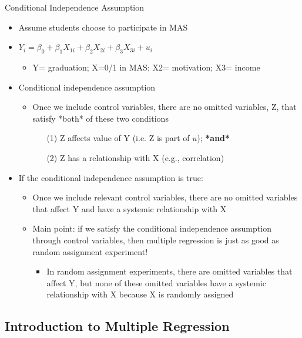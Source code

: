 \begin{frame}[shrink=10]{Conditional Independence Assumption}
	\begin{itemize}
	\item Assume students choose to participate in MAS
	\item $Y_{i} = \beta_{0} + \beta_{1}X_{1i} + \beta_{2}X_{2i} + \beta_{3}X_{3i} + u_{i}$
		\begin{itemize}
		\item Y= graduation; X=0/1 in MAS; X2= motivation; X3= income
		\end{itemize}
	\item Conditional independence assumption
		\begin{itemize}
		\item Once we include control variables, there are no omitted variables, Z, that satisfy *both* of these two conditions
			\begin{itemize}
			\item[(1)] Z affects value of Y (i.e. Z is part of $u$); \textbf{*and*}
			\item[(2)] Z has a relationship with X (e.g., correlation)
			\end{itemize}
		\end{itemize}
	\item If the conditional independence assumption is true:
		\begin{itemize}
		\item Once we include relevant control variables, there are no omitted variables that affect Y and have a systemic relationship with X
		\item Main point: if we satisfy the conditional independence assumption through control variables, then multiple regression is just as good as random assignment experiment!
			\begin{itemize}
			\item In random assignment experiments, there are omitted variables that affect Y, but none of these omitted variables have a systemic relationship with X because X is randomly assigned
			\end{itemize}
		\end{itemize}
	\end{itemize}
\end{frame}

\subsection[Multiple Regression]{Introduction to Multiple Regression}


